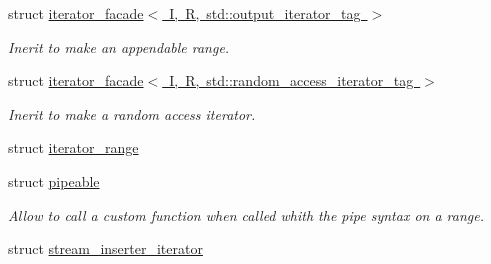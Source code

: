 \begin{DoxyCompactItemize}
struct \mbox{\hyperlink{structrah_1_1iterator__facade_3_01_i_00_01_r_00_01std_1_1output__iterator__tag_01_4}{iterator\+\_\+facade$<$ I, R, std\+::output\+\_\+iterator\+\_\+tag $>$}}
\begin{DoxyCompactList}\small\item\em Inerit to make an appendable range. \end{DoxyCompactList}\item 
struct \mbox{\hyperlink{structrah_1_1iterator__facade_3_01_i_00_01_r_00_01std_1_1random__access__iterator__tag_01_4}{iterator\+\_\+facade$<$ I, R, std\+::random\+\_\+access\+\_\+iterator\+\_\+tag $>$}}
\begin{DoxyCompactList}\small\item\em Inerit to make a random access iterator. \end{DoxyCompactList}\item 
struct \mbox{\hyperlink{structrah_1_1iterator__range}{iterator\+\_\+range}}
\item 
struct \mbox{\hyperlink{structrah_1_1pipeable}{pipeable}}
\begin{DoxyCompactList}\small\item\em Allow to call a custom function when called whith the \textquotesingle{}pipe\textquotesingle{} syntax on a range. \end{DoxyCompactList}\item 
struct \mbox{\hyperlink{structrah_1_1stream__inserter__iterator}{stream\+\_\+inserter\+\_\+iterator}}
\end{DoxyCompactItemize}
